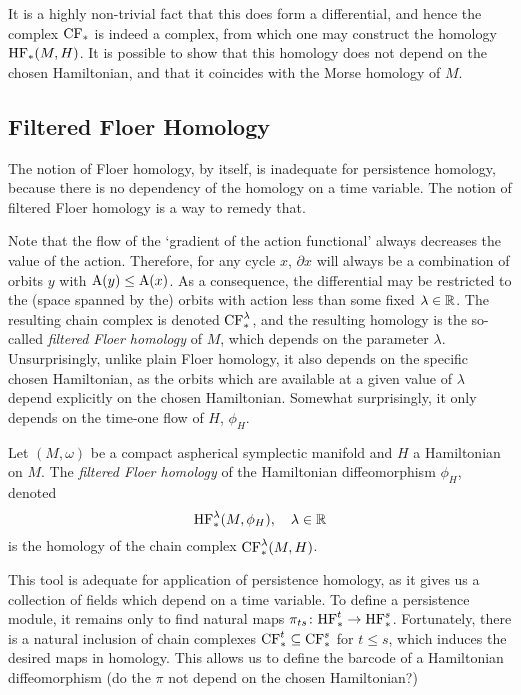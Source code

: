 It is a highly non-trivial fact that this does form a differential, and hence the complex $\CF_*$ is indeed a complex, from which one may construct the homology $\HF_*(M,H)$. It is possible to show that this homology does not depend on the chosen Hamiltonian, and that it coincides with the Morse homology of $M$.

\subsection{Filtered Floer Homology}

The notion of Floer homology, by itself, is inadequate for persistence homology, because there is no dependency of the homology on a time variable. The notion of filtered Floer homology is a way to remedy that.

Note that the flow of the `gradient of the action functional' always decreases the value of the action. Therefore, for any cycle $x$, $\partial x$ will always be a combination of orbits $y$ with $\AA(y) \leq \AA(x)$. As a consequence, the differential may be restricted to the (space spanned by the) orbits with action less than some fixed $\lambda \in \R$. The resulting chain complex is denoted $\CF_*^\lambda$, and the resulting homology is the so-called \emph{filtered Floer homology} of $M$, which depends on the parameter $\lambda$. Unsurprisingly, unlike plain Floer homology, it also depends on the specific chosen Hamiltonian, as the orbits which are available at a given value of $\lambda$ depend explicitly on the chosen Hamiltonian. Somewhat surprisingly, it only depends on the time-one flow of $H$, $\phi_H$.

\begin{definition}
Let $(M,\omega)$ be a compact aspherical symplectic manifold and $H$ a Hamiltonian on $M$. The \emph{filtered Floer homology} of the Hamiltonian diffeomorphism $\phi_H$, denoted
\begin{equation}
\HF^\lambda_*(M,\phi_H), \quad \lambda \in \R
\end{equation}
is the homology of the chain complex $\CF^\lambda_*(M,H)$.
\end{definition}

This tool is adequate for application of persistence homology, as it gives us a collection of fields which depend on a time variable. To define a persistence module, it remains only to find natural maps $\pi_{ts} \colon \HF^t_* \to \HF^s_*$. Fortunately, there is a natural inclusion of chain complexes $\CF^t_* \subseteq \CF^s_*$ for $t \leq s$, which induces the desired maps in homology. This allows us to define the barcode of a Hamiltonian diffeomorphism (do the $\pi$ not depend on the chosen Hamiltonian?)

